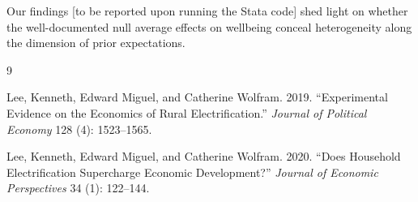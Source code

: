 \documentclass[letter,12pt]{article}
\begin{document}
Our findings [to be reported upon running the Stata code] shed light on
whether the well-documented null average effects on wellbeing conceal
heterogeneity along the dimension of prior expectations.

\clearpage
\begin{singlespace}

\begin{thebibliography}{9}

Lee, Kenneth, Edward Miguel, and Catherine Wolfram. 2019.
``Experimental Evidence on the Economics of Rural Electrification.''
\textit{Journal of Political Economy} 128 (4): 1523--1565.

Lee, Kenneth, Edward Miguel, and Catherine Wolfram. 2020.
``Does Household Electrification Supercharge Economic Development?''
\textit{Journal of Economic Perspectives} 34 (1): 122--144.

\end{thebibliography}
\end{singlespace}
\end{document}
